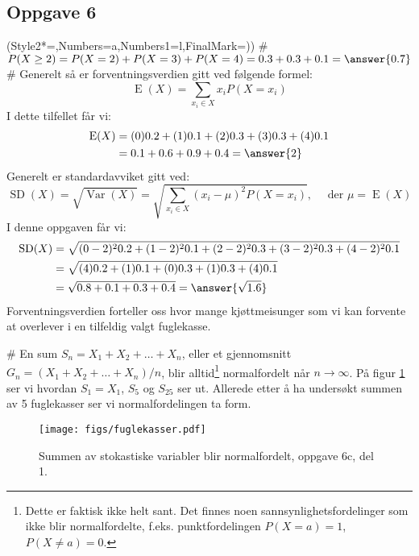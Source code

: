 \subsection*{Oppgave 6}
\begin{easylist}[enumerate]
	\ListProperties(Style2*=,Numbers=a,Numbers1=l,FinalMark={)})
	# $P(X \geq 2) = P(X = 2) + P(X = 3) + P(X = 4) = 0.3 + 0.3 + 0.1 = \answer{0.7}$
	# Generelt så er forventningsverdien gitt ved følgende formel:
	\begin{equation*}
		\operatorname{E}(X) = \sum_{x_i \in X} x_i P(X = x_i) 
	\end{equation*}
	I dette tilfellet får vi:
	\begin{align*}
		\operatorname{E}(X) &= (0) 0.2 + (1) 0.1 + (2) 0.3 + (3) 0.3 + (4) 0.1 \\
		&= 0.1 + 0.6 + 0.9 + 0.4 = \answer{2}
	\end{align*}
	Generelt er standardavviket gitt ved:
	\begin{equation*}
		\operatorname{SD}(X) = \sqrt{\operatorname{Var}(X)} = \sqrt{ \sum_{x_i \in X} \left( x_i - \mu\right)^2  P(X = x_i)}, \quad \text{ der } \mu = \operatorname{E}(X)
	\end{equation*}
	I denne oppgaven får vi:
	\begin{align*}
		\operatorname{SD}(X) &= \sqrt{(0-2)^2 0.2 + (1-2)^2 0.1 + (2-2)^2 0.3 + (3-2)^2 0.3 + (4-2)^2 0.1} \\
		&= \sqrt{(4) 0.2 + (1) 0.1 + (0) 0.3 + (1) 0.3 + (4) 0.1} \\
		&= \sqrt{ 0.8 +  0.1  +  0.3 +  0.4} = \answer{\sqrt{1.6}} 
	\end{align*}
	Forventningsverdien forteller oss hvor mange kjøttmeisunger som
	vi kan forvente at overlever i en tilfeldig valgt fuglekasse.
	
	# En sum $S_n = X_1 + X_2 + \dots + X_n$, eller et gjennomsnitt $G_n = \left( X_1 + X_2 + \dots + X_n \right)/n$, blir alltid\footnote{Dette er faktisk ikke helt sant. Det finnes noen sannsynlighetsfordelinger som ikke blir normalfordelte, f.eks. punktfordelingen $P(X = a) = 1$, $P(X \neq a) = 0$.} normalfordelt når $n \to \infty$. På figur \ref{fig:fuglekasser} ser vi
	hvordan $S_1 = X_1$, $S_5$ og $S_{25}$ ser ut. Allerede etter å ha undersøkt summen
	av 5 fuglekasser ser vi normalfordelingen ta form.
	\begin{figure}[th!]
		\centering
		\texttt{[image: figs/fuglekasser.pdf]}
		\caption{Summen av stokastiske variabler blir normalfordelt, oppgave 6c, del 1. }
		\label{fig:fuglekasser}
	\end{figure}
	

\end{easylist}
